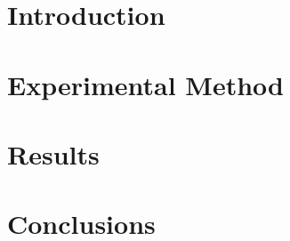\documentclass[12pt]{titlepage}
\begin{document}
\tableofcontents

\listoffigures

\chapter{Introduction} 
 

\chapter{Experimental Method} 


\chapter{Results}


\chapter{Conclusions}


\appendix
\appendixpage
{}


\printbibliography[heading = bibintoc]
\end{document}
